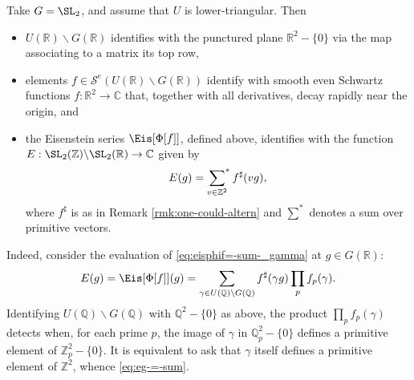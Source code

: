 \begin{example}\label{exa:example-sl2-completed-eisenstein-series}
  Take  $G = \SL_2$, and assume that $U$ is lower-triangular.  Then
  \begin{itemize}
  \item $U(\mathbb{R}) \backslash G(\mathbb{R})$ identifies with the punctured plane $\mathbb{R}^2 - \{0\}$ via the map associating to a matrix its top row,
  \item elements $f \in \mathcal{S}^e(U(\mathbb{R}) \backslash G(\mathbb{R}))$ identify with smooth even Schwartz functions $f : \mathbb{R}^2 \rightarrow \mathbb{C}$ that, together with all derivatives, decay rapidly near the origin, and
  \item the Eisenstein series $\Eis[\Phi[f]]$, defined above, identifies with the function $E : \SL_2(\mathbb{Z}) \backslash \SL_2(\mathbb{R}) \rightarrow \mathbb{C}$ given by
    \begin{equation}\label{eq:eg-=-sum}
      E(g) = \sideset{}{^*}\sum_{v \in \mathbb{Z}^2} f^\sharp( v g),
    \end{equation}
    where $f^\sharp$ is as in Remark \ref{rmk:one-could-altern} and $\sum^*$ denotes a sum over primitive vectors.
  \end{itemize}
  Indeed, consider the evaluation of \eqref{eq:eisphif=-sum-_gamma} at $g \in G(\mathbb{R})$:
  \begin{equation*}
    E(g) = \Eis[\Phi[f]](g) = \sum_{\gamma \in U(\mathbb{Q}) \backslash G(\mathbb{Q})} f^\sharp (\gamma g) \prod_p f_p(\gamma).
  \end{equation*}
  Identifying $U(\mathbb{Q}) \backslash G(\mathbb{Q})$ with $\mathbb{Q}^2 - \{0\}$ as above, the product $\prod_p f_p(\gamma)$ detects when, for each prime $p$, the image of $\gamma$ in $\mathbb{Q}_p^2 - \{0\}$ defines a primitive element of $\mathbb{Z}_p^2 - \{0\}$.  It is equivalent to ask that $\gamma$ itself defines a primitive element of $\mathbb{Z}^2$, whence \eqref{eq:eg-=-sum}.


\end{example}
